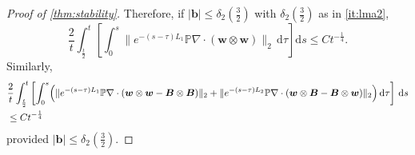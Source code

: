 \documentclass[10pt]{amsart}
\theoremstyle{plain}
\theoremstyle{definition}
\theoremstyle{remark}
\numberwithin{equation}{section}
\newcommand{\bb}{{\boldsymbol{b}}}
\newcommand{\bw}{{\boldsymbol{w}}}
\newcommand{\bB}{{\boldsymbol{B}}}
\begin{document}
\begin{proof}[Proof of \cref{thm:stability}]
Therefore, if $|\bb|\le \delta_2(\frac{3}{2})$ with $\delta_2(\frac{3}{2})$ as in \cref{it:lma2}, 
\[
\frac{2}{t} \int_{\frac{t}{2}}^{t} \left[ \int_0^s \|e^{-(s-\tau)L_1} \mathbb{P}\nabla\cdot (\bw \otimes \bw)\|_2 \, \mathrm{d} \tau \right] \mathrm{d}s \le C t^{-\frac{1}{4}}.
\]
Similarly, 
\begin{align*}
&\frac{2}{t} \int_{\frac{t}{2}}^{t} \left[ \int_0^s \Bigl( \|e^{-(s-\tau)L_1} \mathbb{P}\nabla\cdot (\bw \otimes \bw - \bB \otimes \bB)\|_2 
+ \|e^{-(s-\tau)L_2} \mathbb{P}\nabla\cdot (\bw\otimes \bB - \bB \otimes \bw)\|_2 \Bigr) \, \mathrm{d} \tau \right] \, \mathrm{d}s \\
&\le Ct^{-\frac{1}{4}}
\end{align*}
provided $|\bb| \le \delta_2(\frac{3}{2})$.



\end{proof}
\end{document}
